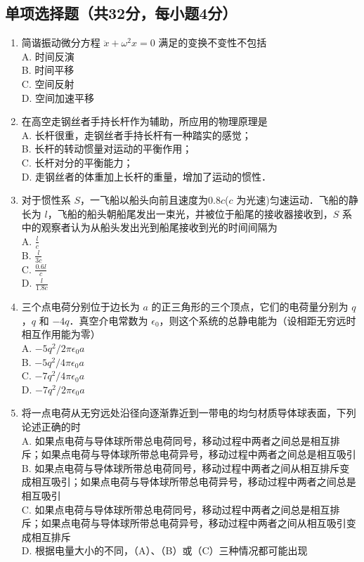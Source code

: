 


\subsection{单项选择题（共32分，每小题4分）}
\begin{enumerate}
\item 简谐振动微分方程 $\ddot{x}+{\omega}^2{x}=0$ 满足的变换不变性不包括\\
A. 时间反演\\
B. 时间平移\\
C. 空间反射\\
D. 空间加速平移\\

\item 在高空走钢丝者手持长杆作为辅助，所应用的物理原理是\\
A. 长杆很重，走钢丝者手持长杆有一种踏实的感觉；\\
B. 长杆的转动惯量对运动的平衡作用；\\
C. 长杆对分的平衡能力；\\
D. 走钢丝者的体重加上长杆的重量，增加了运动的惯性．\\

\item 对于惯性系 $S$，一飞船以船头向前且速度为0.8$c$($c$ 为光速)匀速运动．飞船的静长为 $l$，飞船的船头朝船尾发出一束光，并被位于船尾的接收器接收到，$S$ 系中的观察者认为从船头发出光到船尾接收到光的时间间隔为\\
A. $\frac{l}{c}$\\
B. $\frac{l}{3c}$\\
C. $\frac{0.6l}{c}$\\
D. $\frac{l}{1.8c}$\\

\item 三个点电荷分别位于边长为 $a$ 的正三角形的三个顶点，它们的电荷量分别为 $q$，$q$ 和 $-4q$．真空介电常数为 $\epsilon_{0}$，则这个系统的总静电能为（设相距无穷远时相互作用能为零）\\
A. $-5q^{2}/2\pi \epsilon_{0} a$\\
B. $-5q^{2}/4\pi \epsilon_{0} a$\\
C. $-7q^{2}/4\pi \epsilon_{0} a$\\
D. $-7q^{2}/2\pi \epsilon_{0} a$\\

\item 将一点电荷从无穷远处沿径向逐渐靠近到一带电的均匀材质导体球表面，下列论述正确的时\\
A. 如果点电荷与导体球所带总电荷同号，移动过程中两者之间总是相互排斥；如果点电荷与导体球所带总电荷异号，移动过程中两者之间总是相互吸引\\
B. 如果点电荷与导体球所带总电荷同号，移动过程中两者之间从相互排斥变成相互吸引；如果点电荷与导体球所带总电荷异号，移动过程中两者之间总是相互吸引\\
C. 如果点电荷与导体球所带总电荷同号，移动过程中两者之间总是相互排斥；如果点电荷与导体球所带总电荷异号，移动过程中两者之间从相互吸引变成相互排斥\\
D. 根据电量大小的不同，（A）、（B）或（C）三种情况都可能出现\\


\end{enumerate}
